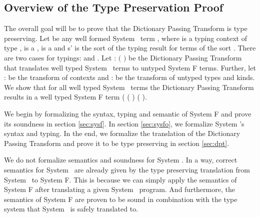 \subsection{Overview of the Type Preservation Proof}\label{sec:ov}
The overall goal will be to prove that the Dictionary Passing Transform is type preserving. 
Let  be any well formed System \Fo\ term    \Constr{:} , where  is a typing context of type ,  is a  ,  is a   and s' is the sort of the typing result for terms of the sort . 
There are two cases for typings:    \Constr{:}  and    \Constr{:} .
Let  : $($   \Constr{:} $)$    be the Dictionary Passing Transform that translates well typed System \Fo\ terms to untyped System F terms. 
Further, let  :    be the transform of contexts and  :      be the transform of untyped types and kinds. 
We show that for all well typed System \Fo\  terms  the Dictionary Passing Transform results in a well typed System F term (   ( ) \Constr{:} ( ). 

\noindent We begin by formalizing the syntax, typing and semantic of System F and prove its soundness in section \ref{sec:sysf}. 
In section \ref{sec:sysfo}, we formalize System \Fo's syntax and typing. 
In the end, we formalize the translation of the Dictionary Passing Transform and prove it to be type preserving in section \ref{sec:dpt}. 

\noindent We do not formalize semantics and soundness for System \Fo. 
In a way, correct semantics for System \Fo\ are already given by the type preserving translation from System \Fo\ to System F. 
This is because we can simply apply the semantics of System F after translating a given System \Fo\ program. 
And furthermore, the semantics of System F are proven to be sound in combination with the type system that System \Fo\ is safely translated to.